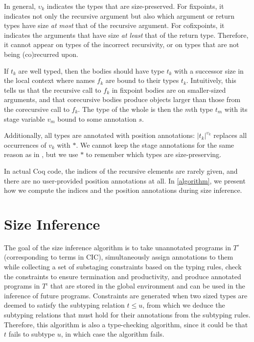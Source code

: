 \documentclass[sigplan,10pt,anonymous,review]{acmart}
\begin{document}
In general, $\upsilon_k$ indicates the types that are size-preserved. For fixpoints, it indicates not only the recursive argument but also which argument or return types have size \textit{at most} that of the recursive argument. For cofixpoints, it indicates the arguments that have size \textit{at least} that of the return type. Therefore, it cannot appear on types of the incorrect recursivity, or on types that are not being (co)\-recurred upon. 

If $t_k$ are well typed, then the \cofixpoint bodies should have type $t_k$ with a successor size in the local context where \cofixpoint names $f_k$ are bound to their types $t_k$. Intuitively, this tells us that the recursive call to $f_k$ in fixpoint bodies are on smaller-sized arguments, and that corecursive bodies produce objects larger than those from the corecursive call to $f_k$. The type of the whole \cofixpoint is then the $m$th type $t_m$ with its stage variable $v_m$ bound to some annotation $s$.

Additionally, all \cofixpoint types are annotated with position annotations: $|t_k|^{\upsilon_k}$ replaces all occurrences of $v_k$ with $*$. We cannot keep the stage annotations for the same reason as in , but we use $*$ to remember which types are size-preserving.

In actual Coq code, the indices of the recursive elements are rarely given, and there are no user-provided position annotations at all. In \autoref{algorithm}, we present how we compute the indices and the position annotations during size inference.

\section{Size Inference}\label{algorithm}

The goal of the size inference algorithm is to take unannotated programs in $T^\circ$ (corresponding to terms in CIC), simultaneously assign annotations to them while collecting a set of substaging constraints based on the typing rules, check the constraints to ensure termination and productivity, and produce annotated programs in $T^\iota$ that are stored in the global environment and can be used in the inference of future programs. Constraints are generated when two sized types are deemed to satisfy the subtyping relation $t \leq u$, from which we deduce the subtyping relations that must hold for their annotations from the subtyping rules. Therefore, this algorithm is also a type-checking algorithm, since it could be that $t$ fails to subtype $u$, in which case the algorithm fails.
\end{document}
